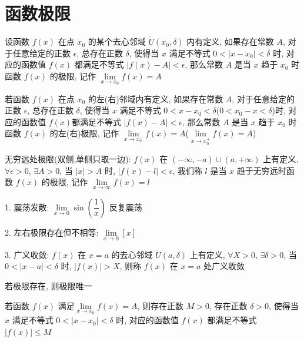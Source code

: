 \section{函数极限}
\begin{definition}[函数极限]
	设函数 $f(x)$ 在点 $x_{0}$ 的某个去心邻域 $\mathring{U}(x_{0},\delta)$ 内有定义, 如果存在常数 $A$, 对于任意给定的正数 $\epsilon$, 总存在正数 $\delta$, 使得当 $x$ 满足不等式 $0<|x-x_{0}|<\delta$ 时, 对应的函数值 $f(x)$ 都满足不等式 $|f(x)-A|<\epsilon$, 那么常数 $A$ 是当 $x$ 趋于 $x_{0}$ 时函数 $f(x)$ 的极限, 记作 $\lim\limits_{x\to x_{0}}f(x)=A$
\end{definition}

\begin{definition}[单侧极限]
	若函数 $f(x)$ 在点 $x_{0}$ 的左(右)邻域内有定义, 如果存在常数 $A$, 对于任意给定的正数 $\epsilon$, 总存在正数 $\delta$, 使得当 $x$ 满足不等式 $0<x-x_{0}<\delta$($0<x_{0}-x<\delta$)时, 对应的函数值 $f(x)$都满足不等式 $|f(x)-A|<\epsilon$, 那么常数 $A$ 是当 $x$ 趋于 $x_{0}$ 时函数 $f(x)$ 的左(右)极限, 记作 $\lim\limits_{x\to x_{0}^{-}}f(x)=A$($\lim\limits_{x\to x_{0}^{+}}f(x)=A$)
\end{definition}

\begin{definition}[无穷远极限]
	无穷远处极限(双侧,单侧只取一边): $f(x)$ 在 $(-\infty,-a)\cup(a,+\infty)$ 上有定义, $\forall \epsilon>0$, $\exists A>0$, 当 $|x|>A$ 时, $|f(x)-l|<\epsilon$, 我们称 $l$ 是当 $x$ 趋于无穷远时函数 $f(x)$ 的极限, 记作 $\lim\limits_{x\to\infty}f(x)=l$
\end{definition}
\begin{definition}[极限发散]
	1. 震荡发散: $\lim\limits_{x\to 0}\sin(\dfrac{1}{x})$ 反复震荡

	2. 左右极限存在但不相等: $\lim\limits_{x\to 0}[x]$

	3. 广义收敛: $f(x)$ 在 $x=a$ 的去心邻域 $\mathring{U}(a,\delta)$ 上有定义, $\forall X>0$, $\exists \delta>0$, 当 $0<|x-a|<\delta$ 时, $|f(x)|>X$, 则称 $f(x)$ 在 $x=a$ 处广义收敛
\end{definition}

\begin{property}[唯一性]
	若极限存在, 则极限唯一
\end{property}

\begin{property}[局部有界性]
	若函数 $f(x)$ 满足$\lim\limits_{x\to x_{0}}f(x)=A$, 则存在正数 $M>0$, 存在正数 $\delta>0$, 使得当 $x$ 满足不等式 $0<|x-x_{0}|<\delta$ 时, 对应的函数值 $f(x)$ 都满足不等式 $|f(x)|\leq M$
\end{property}

